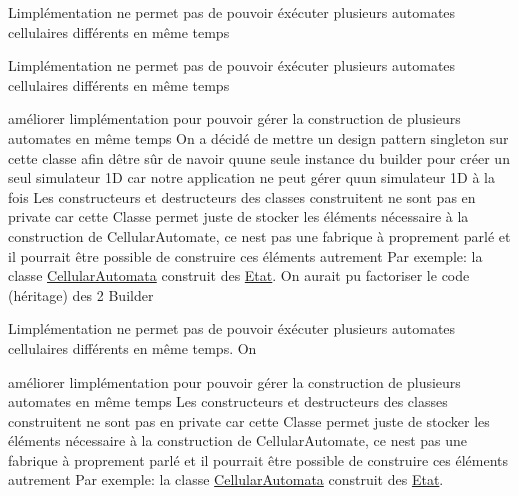 
\begin{DoxyRefList}
\item[\label{todo__todo000001}%
\Hypertarget{todo__todo000001}%
Classe \mbox{\hyperlink{class_c_a_builder}{C\+A\+Builder}} ]L\textquotesingle{}implémentation ne permet pas de pouvoir éxécuter plusieurs automates cellulaires différents en même temps  
\item[\label{todo__todo000002}%
\Hypertarget{todo__todo000002}%
Classe \mbox{\hyperlink{class_c_a_builder1_d}{C\+A\+Builder1D}} ]L\textquotesingle{}implémentation ne permet pas de pouvoir éxécuter plusieurs automates cellulaires différents en même temps 

améliorer l\textquotesingle{}implémentation pour pouvoir gérer la construction de plusieurs automates en même temps On a décidé de mettre un design pattern singleton sur cette classe afin d\textquotesingle{}être sûr de n\textquotesingle{}avoir qu\textquotesingle{}une seule instance du builder pour créer un seul simulateur 1D car notre application ne peut gérer qu\textquotesingle{}un simulateur 1D à la fois Les constructeurs et destructeurs des classes construitent ne sont pas en private car cette Classe permet juste de stocker les éléments nécessaire à la construction de Cellular\+Automate, ce n\textquotesingle{}est pas une fabrique à proprement parlé et il pourrait être possible de construire ces éléments autrement Par exemple\+: la classe \mbox{\hyperlink{class_cellular_automata}{Cellular\+Automata}} construit des \mbox{\hyperlink{class_etat}{Etat}}. On aurait pu factoriser le code (héritage) des 2 Builder 
\item[\label{todo__todo000003}%
\Hypertarget{todo__todo000003}%
Classe \mbox{\hyperlink{class_c_a_builder2_d}{C\+A\+Builder2D}} ]L\textquotesingle{}implémentation ne permet pas de pouvoir éxécuter plusieurs automates cellulaires différents en même temps. On 

améliorer l\textquotesingle{}implémentation pour pouvoir gérer la construction de plusieurs automates en même temps Les constructeurs et destructeurs des classes construitent ne sont pas en private car cette Classe permet juste de stocker les éléments nécessaire à la construction de Cellular\+Automate, ce n\textquotesingle{}est pas une fabrique à proprement parlé et il pourrait être possible de construire ces éléments autrement Par exemple\+: la classe \mbox{\hyperlink{class_cellular_automata}{Cellular\+Automata}} construit des \mbox{\hyperlink{class_etat}{Etat}}.
\end{DoxyRefList}